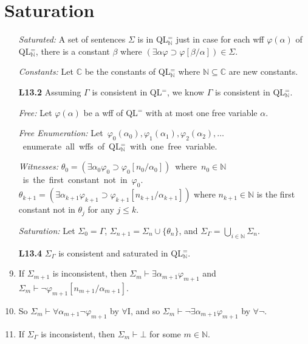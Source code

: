 \documentclass[a4paper, 11pt]{article} %
\def\proves{\ensuremath{\vdash}}
\newcommand{\set}[1]{\lbrace#1\rbrace} %
\newcommand{\N}{\mathbb{N}}
\newcommand{\C}{\mathbb{C}}
\newcommand{\qt}[2]{#1 #2} %
\newcommand{\unisub}[2]{[#1/#2]}
\def\metaA{\ensuremath{\varphi}}
\begin{document}
\section*{Saturation}

\begin{enumerate}
  \item[\it Saturated:] A set of sentences $\Sigma$ is  in QL$^=_{\N}$ just in case for each wff $\metaA(\alpha)$ of QL$^=_{\N}$, there is a constant $\beta$ where $(\qt{\exists}{\alpha}\metaA \supset \metaA\unisub{\beta}{\alpha})\in\Sigma$.
  \item[\it Constants:] Let $\C$ be the constants of QL$^=_{\N}$ where $\N\subseteq\C$ are new constants.
  \item[\bf L13.2] Assuming $\Gamma$ is consistent in QL$^=$, we know $\Gamma$ is consistent in QL$^=_{\N}$.
  \item[\it Free:] Let $\metaA(\alpha)$ be a wff of QL$^=$ with at most one free variable $\alpha$.
  \item[\it Free Enumeration:] \mbox{Let $\metaA_0(\alpha_0),\metaA_1(\alpha_1),\metaA_2(\alpha_2),\ldots$ enumerate all wffs of QL$^=_{\N}$ with one free variable.}
  \item[\it Witnesses:] \mbox{$\theta_0=(\qt{\exists}{\alpha_0}\metaA_0\supset \metaA_0\unisub{n_0}{\alpha_0})$ where $n_0\in\N$ is the first constant not in $\metaA_0$.}\vspace{.05in}\\
    $\theta_{k+1}=(\qt{\exists}{\alpha_{k+1}}\metaA_{k+1}\supset \metaA_{k+1}\unisub{n_{k+1}}{\alpha_{k+1}})$  where $n_{k+1}\in\N$ is the first constant not in $\theta_j$ for any $j\leq k$.
  \item[\it Saturation:] Let $\Sigma_0 = \Gamma$, $\Sigma_{n+1} = \Sigma_n\cup\set{\theta_n}$, and $\Sigma_\Gamma = \bigcup_{i\in\N}\Sigma_n$.
  \item[\bf L13.4] $\Sigma_\Gamma$ is consistent and saturated in QL$^=_{\N}$.
  \item If $\Sigma_{m+1}$ is inconsistent, then $\Sigma_m\proves \qt{\exists}{\alpha_{m+1}}\metaA_{m+1}$ and $\Sigma_m\proves\neg\metaA_{m+1}\unisub{n_{m+1}}{\alpha_{m+1}}$.
  \item So $\Sigma_m\proves \qt{\forall}{\alpha_{m+1}}\neg\metaA_{m+1}$ by $\forall$I, and so $\Sigma_m\proves \neg\qt{\exists}{\alpha_{m+1}}\metaA_{m+1}$ by $\forall\neg$.
  \item If $\Sigma_\Gamma$ is inconsistent, then $\Sigma_m\proves\bot$ for some $m\in\N$.
\end{enumerate}
\end{document}

